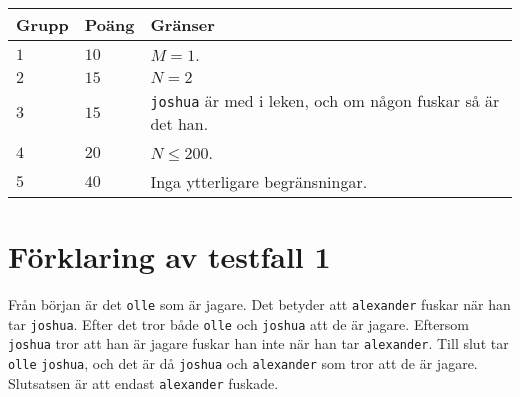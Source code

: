 \noindent
\begin{tabular}{| l | l | p{12cm} |}
  \hline
  \textbf{Grupp} & \textbf{Poäng} & \textbf{Gränser} \\ \hline
  $1$    & $10$       & $M = 1$. \\ \hline
  $2$    & $15$       & $N = 2$ \\ \hline
  $3$    & $15$       & \texttt{joshua} är med i leken, och om någon fuskar så är det han. \\ \hline
  $4$    & $20$       & $N \leq 200$. \\ \hline
  $5$    & $40$       & Inga ytterligare begränsningar. \\ \hline
\end{tabular}

\section*{Förklaring av testfall 1}
Från början är det \texttt{olle} som är jagare. 
Det betyder att \texttt{alexander} fuskar när han tar \texttt{joshua}. 
Efter det tror både \texttt{olle} och \texttt{joshua} att de är jagare.
Eftersom \texttt{joshua} tror att han är jagare fuskar han inte när han tar \texttt{alexander}.
Till slut tar \texttt{olle} \texttt{joshua}, och det är då \texttt{joshua} och \texttt{alexander} som tror att de är jagare.
Slutsatsen är att endast \texttt{alexander} fuskade.
